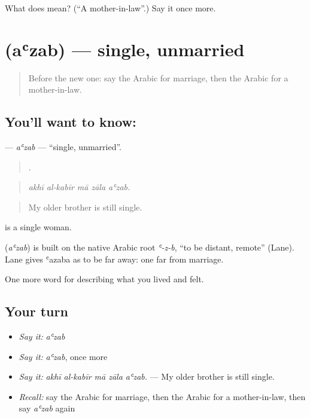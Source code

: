 \begin{tcolorbox}[breakable,colback=teal!4,colframe=teal!35!black,title={Before you move on}]
What does  mean? (\textquotedblleft{}A mother-in-law\textquotedblright{}.) Say it once more.
\end{tcolorbox}
\section[\texorpdfstring{\ar{أعزب} (aʿzab)}{أعزب (aʿzab)}]{ (aʿzab) — single, unmarried}

\label{lesson:AR-C528-azab}



\begin{quote}
Before the new one: say the Arabic for marriage, then the Arabic for a mother-in-law.
\end{quote}

\subsection*{You'll want to know: }
\textbf{} — \emph{aʿzab} — \textquotedblleft{}single, unmarried\textquotedblright{}.

\begin{quote}
    .
\end{quote}

\begin{quote}
\emph{akhī al-kabīr mā zāla aʿzab.}
\end{quote}

\begin{quote}
My older brother is still single.
\end{quote}

 is a single woman.

\begin{cousinweb}
\textbf{} (\emph{aʿzab}) is built on the native Arabic root \emph{ʿ-z-b}, \textquotedblleft{}to be distant, remote\textquotedblright{} (Lane). Lane gives ʿazaba as to be far away: one far from marriage.
\end{cousinweb}

\begin{grammarlens}[title={What you've built}]
One more word for describing what you lived and felt.
\end{grammarlens}

\subsection*{Your turn}
\begin{itemize}
\raggedright
  \item \emph{Say it:} \emph{aʿzab}
  \item \emph{Say it:} \emph{aʿzab}, once more
  \item \emph{Say it:} \emph{akhī al-kabīr mā zāla aʿzab.} — My older brother is still single.
  \item \emph{Recall:} say the Arabic for marriage, then the Arabic for a mother-in-law, then say \emph{aʿzab} again
\end{itemize}


